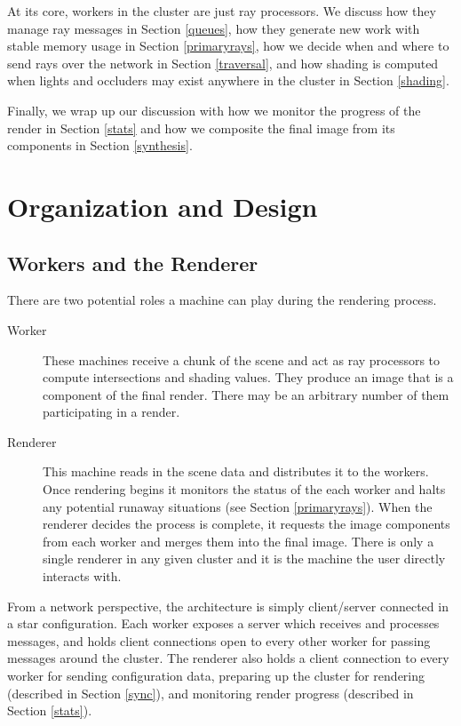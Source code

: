 \documentclass[12pt]{ucthesis}
\begin{document}
At its core, workers in the cluster are just ray processors. We discuss how they
manage ray messages in Section \ref{queues}, how they generate new work with
stable memory usage in Section \ref{primaryrays}, how we decide when and where
to send rays over the network in Section \ref{traversal}, and how shading is computed
when lights and occluders may exist anywhere in the cluster in Section \ref{shading}.

Finally, we wrap up our discussion with how we monitor the progress of the
render in Section \ref{stats} and how we composite the final image from its
components in Section \ref{synthesis}.

\section{Organization and Design}
\label{organization}

\subsection{Workers and the Renderer}
\label{workers}

There are two potential roles a machine can play during the rendering process.

\begin{description}
    \item[Worker] These machines receive a chunk of the scene and act as ray
        processors to compute intersections and shading values. They produce
        an image that is a component of the final render. There may be an
        arbitrary number of them participating in a render.
    \item[Renderer] This machine reads in the scene data and distributes it to
        the workers. Once rendering begins it monitors the status of the each
        worker and halts any potential runaway situations (see Section \ref{primaryrays}).
        When the renderer decides the process is complete, it requests
        the image components from each worker and merges them into the final
        image. There is only a single renderer in any given cluster and it is
        the machine the user directly interacts with.
\end{description}

From a network perspective, the architecture is simply client/server connected
in a star configuration. Each worker exposes a server which receives and
processes messages, and holds client connections open to every other worker for
passing messages around the cluster. The renderer also holds a client connection
to every worker for sending configuration data, preparing up the cluster for rendering
(described in Section \ref{sync}), and monitoring render progress (described in
Section \ref{stats}).
\end{document}
